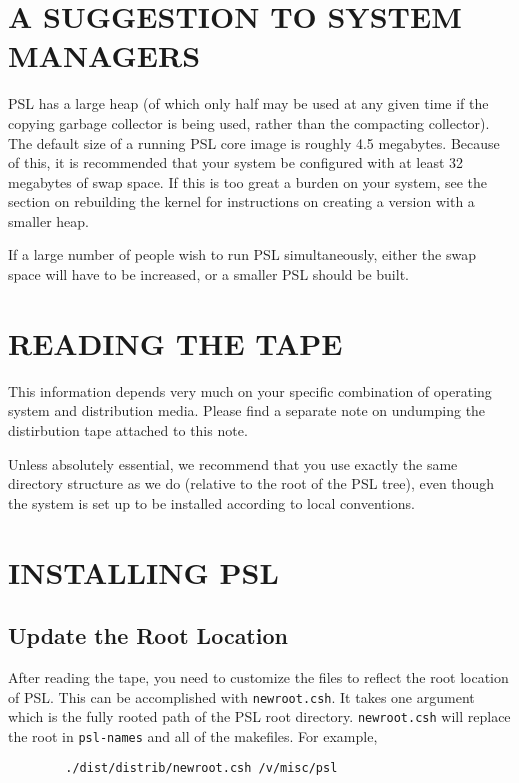 \bigskip


\section{A SUGGESTION TO SYSTEM MANAGERS}

PSL has a large heap (of which only half may be used at any
given time if the copying garbage collector is being used, 
rather than the compacting collector).  
The default size of a running PSL core image is roughly 4.5 megabytes.  
Because of this, it is recommended
that your system be configured with at least 32 megabytes of swap
space.  If this is too great a burden on your system, see the section
on rebuilding the kernel for instructions on creating a version with 
a smaller heap.

If a large number of people wish to run PSL simultaneously, either
the swap space will have to be increased, or a smaller PSL should be built.

\section{READING THE TAPE}

This information depends very much on your specific combination of
operating system and distribution media. Please find a separate note 
on undumping the distirbution tape attached to this note.

Unless absolutely essential, we recommend that you use exactly the same
directory structure as we do (relative to the root of the PSL tree),
even though the system is set up to be installed according to local
conventions.

\section{INSTALLING PSL}

\subsection{Update the Root Location}

After reading the tape, you need to customize the files to reflect the
root location of PSL.  This can be accomplished with
{\tt newroot.csh}.  It takes one argument which is the fully rooted
path of the PSL root directory.  {\tt newroot.csh} will replace the root
in {\tt psl-names} and all of the makefiles.  For example,

\begin{verbatim}
        ./dist/distrib/newroot.csh /v/misc/psl
\end{verbatim}

